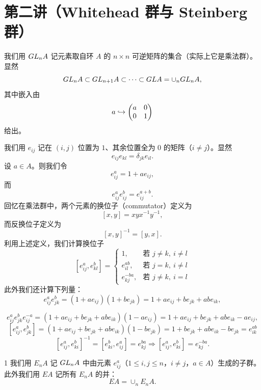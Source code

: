 \section{第二讲（Whitehead 群与 Steinberg 群）}

我们用 $GL_nA$ 记元素取自环 $A$ 的 $n\times n$ 可逆矩阵的集合（实际上它是乘法群）。显然
\[
  GL_nA \subset GL_{n+1}A \subset \dots \subset GL A = \cup_n GL_nA,
\]
其中嵌入由
\[
  a \hookrightarrow \begin{pmatrix} a & 0 \\ 0 & 1 \end{pmatrix}
\]
给出。

我们用 $e_{ij}$ 记在 $(i,j)$ 位置为 $1$、其余位置全为 $0$ 的矩阵（$i\ne j$）。显然
\[
  e_{ij}e_{kl} = \delta_{jk}e_{il}.
\]
设 $a\in A$。则我们令
\[
  e_{ij}^a = 1 + ae_{ij},
\]
而
\[
  e_{ij}^a e_{ij}^b = e_{ij}^{a+b}.
\]
回忆在乘法群中，两个元素的换位子（commutator）定义为
\[
  [x,y] = xyx^{-1}y^{-1},
\]
而反换位子定义为
\[
  [x,y]^{-1} = [y,x].
\]
利用上述定义，我们计算换位子
\[
  [e_{ij}^a, e_{kl}^b] =
  \begin{cases}
    1, & \text{若 } j\ne k,\ i\ne l \\
    e_{il}^{ab}, & \text{若 } j=k,\ i\ne l \\
    e_{kj}^{-ba}, & \text{若 } j\ne k,\ i=l
  \end{cases}
\]
此外我们还计算下列量：
\[
  e_{ij}^a e_{jk}^b = (1+ae_{ij})(1+be_{jk}) = 1 + ae_{ij} + be_{jk} + abe_{ik},
\]

\[
  e_{ij}^a e_{jk}^b e_{ij}^{-a} = (1+ae_{ij}+be_{jk}+abe_{ik})(1-ae_{ij}) = 1 + ae_{ij} + be_{jk} + abe_{ik} - ae_{ij},
\]
\[
  [e_{ij}^a, e_{jk}^b] = (1+ae_{ij}+be_{jk}+abe_{ik})(1-be_{jk}) = 1 + be_{jk} + abe_{ik} - be_{jk} = e_{ik}^{ab}
\]
\[
  [e_{ij}^a, e_{ki}^b]^{-1} = [e_{ki}^b, e_{ij}^a] = e_{kj}^{ba} \Rightarrow [e_{ij}^a, e_{ki}^b] = e_{kj}^{-ba}.
\]

\begin{defn}{1}
我们用 $E_nA$ 记 $GL_nA$ 中由元素 $e_{ij}^a$（$1\le i,j\le n$，$i\ne j$，$a\in A$）生成的子群。此外我们用 $EA$ 记所有 $E_nA$ 的并：
\[
  EA = \cup_n E_nA.
\]
\end{defn}

